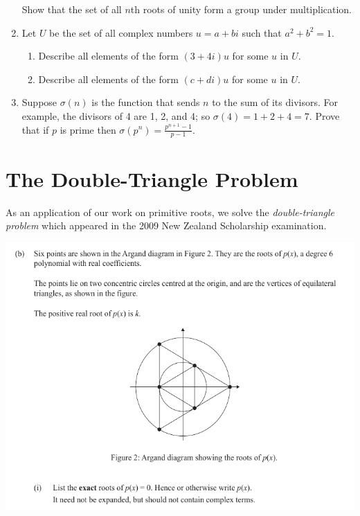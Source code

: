 \documentclass[a4paper,10pt,titlepage]{article}
\theoremstyle{definition}
\begin{document}
\begin{enumerate}
\begin{enumerate}
        \end{enumerate}
       Show that the set of all $ n$th roots of unity form a group under multiplication.
  \item Let $ U $ be the set of all complex numbers $ u = a + bi $ such that $ a^2 + b^2 = 1 $.
        \begin{enumerate}
          \item Describe all elements of the form $ (3 + 4i)u $ for some $ u $ in $ U $.
          \item Describe all elements of the form $ (c + di)u $ for some $ u $ in $ U $.
        \end{enumerate}
  \item Suppose $ \sigma(n) $ is the function that sends $ n $ to the sum of its divisors. For example,
        the divisors of 4 are 1, 2, and 4; so $ \sigma(4) = 1 + 2 + 4 = 7 $. Prove that if $ p $ is
        prime then $ \sigma(p^n) = \frac{p^{n+1} - 1}{p - 1} $.
\end{enumerate}

\section{The Double-Triangle Problem}\label{sec:triangle}
As an application of our work on primitive roots, we solve the \emph{double-triangle problem} which appeared
in the 2009 New Zealand Scholarship examination.

\begin{center}
  \includegraphics[width=\textwidth]{double_triangle}
\end{center}
\end{document}
